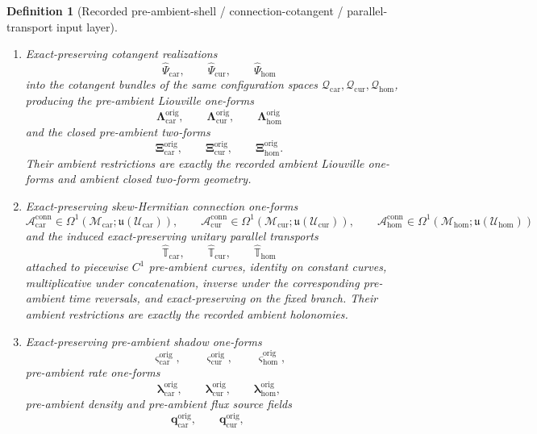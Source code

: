 \documentclass[11pt]{article}
\newcommand{\RootTensorClass}{\mathscr U_{\mathrm{car}}}
\newcommand{\RootRelabelClass}{\mathscr U_{\mathrm{cur}}}
\newcommand{\RootFreeClass}{\mathscr U_{\mathrm{hom}}}
\newcommand{\TensorConstraintTarget}{\mathcal K_{\mathrm{car}}}
\newcommand{\CurConstraintTarget}{\mathcal K_{\mathrm{cur}}}
\newcommand{\HomConstraintTarget}{\mathcal K_{\mathrm{hom}}}
\newcommand{\TensorConstraintMetric}{m_{\mathrm{car}}^{\mathrm{con}}}
\newcommand{\CurConstraintMetric}{m_{\mathrm{cur}}^{\mathrm{con}}}
\newcommand{\HomConstraintMetric}{m_{\mathrm{hom}}^{\mathrm{con}}}
\newcommand{\TensorConstraintGap}{\delta_{\mathrm{car}}}
\newcommand{\CurConstraintGap}{\delta_{\mathrm{cur}}}
\newcommand{\HomConstraintGap}{\delta_{\mathrm{hom}}}
\newcommand{\TensorConfigSpace}{\mathcal Q_{\mathrm{car}}}
\newcommand{\CurConfigSpace}{\mathcal Q_{\mathrm{cur}}}
\newcommand{\HomConfigSpace}{\mathcal Q_{\mathrm{hom}}}
\newcommand{\TensorOriginSpace}{\mathcal M_{\mathrm{car}}}
\newcommand{\CurOriginSpace}{\mathcal M_{\mathrm{cur}}}
\newcommand{\HomOriginSpace}{\mathcal M_{\mathrm{hom}}}
\newcommand{\TensorOriginConstraintMap}{\widehat{\mathfrak C}_{\mathrm{car}}}
\newcommand{\CurOriginConstraintMap}{\widehat{\mathfrak C}_{\mathrm{cur}}}
\newcommand{\HomOriginConstraintMap}{\widehat{\mathfrak C}_{\mathrm{hom}}}
\newcommand{\TensorOriginCotangentRealization}{\widehat\Psi_{\mathrm{car}}}
\newcommand{\CurOriginCotangentRealization}{\widehat\Psi_{\mathrm{cur}}}
\newcommand{\HomOriginCotangentRealization}{\widehat\Psi_{\mathrm{hom}}}
\newcommand{\TensorOriginLiouville}{\boldsymbol{\Lambda}_{\mathrm{car}}^{\mathrm{orig}}}
\newcommand{\CurOriginLiouville}{\boldsymbol{\Lambda}_{\mathrm{cur}}^{\mathrm{orig}}}
\newcommand{\HomOriginLiouville}{\boldsymbol{\Lambda}_{\mathrm{hom}}^{\mathrm{orig}}}
\newcommand{\TensorOriginTwo}{\boldsymbol{\Xi}_{\mathrm{car}}^{\mathrm{orig}}}
\newcommand{\CurOriginTwo}{\boldsymbol{\Xi}_{\mathrm{cur}}^{\mathrm{orig}}}
\newcommand{\HomOriginTwo}{\boldsymbol{\Xi}_{\mathrm{hom}}^{\mathrm{orig}}}
\newcommand{\TensorConnectionForm}{\mathcal A_{\mathrm{car}}^{\mathrm{conn}}}
\newcommand{\CurConnectionForm}{\mathcal A_{\mathrm{cur}}^{\mathrm{conn}}}
\newcommand{\HomConnectionForm}{\mathcal A_{\mathrm{hom}}^{\mathrm{conn}}}
\newcommand{\TensorOriginTransport}{\widehat{\mathbb T}_{\mathrm{car}}}
\newcommand{\CurOriginTransport}{\widehat{\mathbb T}_{\mathrm{cur}}}
\newcommand{\HomOriginTransport}{\widehat{\mathbb T}_{\mathrm{hom}}}
\newcommand{\TensorOriginShadowForm}{\boldsymbol{\varsigma}_{\mathrm{car}}^{\mathrm{orig}}}
\newcommand{\CurOriginShadowForm}{\boldsymbol{\varsigma}_{\mathrm{cur}}^{\mathrm{orig}}}
\newcommand{\HomOriginShadowForm}{\boldsymbol{\varsigma}_{\mathrm{hom}}^{\mathrm{orig}}}
\newcommand{\TensorOriginRateForm}{\boldsymbol{\lambda}_{\mathrm{car}}^{\mathrm{orig}}}
\newcommand{\CurOriginRateForm}{\boldsymbol{\lambda}_{\mathrm{cur}}^{\mathrm{orig}}}
\newcommand{\HomOriginRateForm}{\boldsymbol{\lambda}_{\mathrm{hom}}^{\mathrm{orig}}}
\newcommand{\TensorOriginDensitySource}{\boldsymbol{q}_{\mathrm{car}}^{\mathrm{orig}}}
\newcommand{\CurOriginDensitySource}{\boldsymbol{q}_{\mathrm{cur}}^{\mathrm{orig}}}
\newcommand{\LieU}{\mathfrak u}
\newtheorem{definition}{Definition}
\begin{document}
\begin{definition}[Recorded pre-ambient-shell / connection-cotangent / parallel-transport input layer]
\begin{enumerate}
    \[
    \TensorOriginConstraintMap,\qquad
    \CurOriginConstraintMap,\qquad
    \HomOriginConstraintMap
    \]
    into the same positive target spaces \(\TensorConstraintTarget,\CurConstraintTarget,\HomConstraintTarget\) with the same positive target metrics \(\TensorConstraintMetric,\CurConstraintMetric,\HomConstraintMetric\). Their restrictions to the current ambient shells are exactly the recorded ambient exact-constraint maps and carry the same recorded positive exact-constraint gap bounds \(\TensorConstraintGap,\CurConstraintGap,\HomConstraintGap>0\).
    \item Exact-preserving cotangent realizations
    \[
    \TensorOriginCotangentRealization,\qquad
    \CurOriginCotangentRealization,\qquad
    \HomOriginCotangentRealization
    \]
    into the cotangent bundles of the same configuration spaces \(\TensorConfigSpace,\CurConfigSpace,\HomConfigSpace\), producing the pre-ambient Liouville one-forms
    \[
    \TensorOriginLiouville,\qquad
    \CurOriginLiouville,\qquad
    \HomOriginLiouville
    \]
    and the closed pre-ambient two-forms
    \[
    \TensorOriginTwo,\qquad
    \CurOriginTwo,\qquad
    \HomOriginTwo.
    \]
    Their ambient restrictions are exactly the recorded ambient Liouville one-forms and ambient closed two-form geometry.
    \item Exact-preserving skew-Hermitian connection one-forms
    \[
    \TensorConnectionForm\in\Omega^1(\TensorOriginSpace;\LieU(\RootTensorClass)),\qquad
    \CurConnectionForm\in\Omega^1(\CurOriginSpace;\LieU(\RootRelabelClass)),\qquad
    \HomConnectionForm\in\Omega^1(\HomOriginSpace;\LieU(\RootFreeClass))
    \]
    and the induced exact-preserving unitary parallel transports
    \[
    \TensorOriginTransport,\qquad
    \CurOriginTransport,\qquad
    \HomOriginTransport
    \]
    attached to piecewise \(C^1\) pre-ambient curves, identity on constant curves, multiplicative under concatenation, inverse under the corresponding pre-ambient time reversals, and exact-preserving on the fixed branch. Their ambient restrictions are exactly the recorded ambient holonomies.
    \item Exact-preserving pre-ambient shadow one-forms
    \[
    \TensorOriginShadowForm,\qquad
    \CurOriginShadowForm,\qquad
    \HomOriginShadowForm,
    \]
    pre-ambient rate one-forms
    \[
    \TensorOriginRateForm,\qquad
    \CurOriginRateForm,\qquad
    \HomOriginRateForm,
    \]
    pre-ambient density and pre-ambient flux source fields
    \[
    \TensorOriginDensitySource,\qquad
    \CurOriginDensitySource,\qquad
\]
\end{enumerate}
\end{definition}
\end{document}
